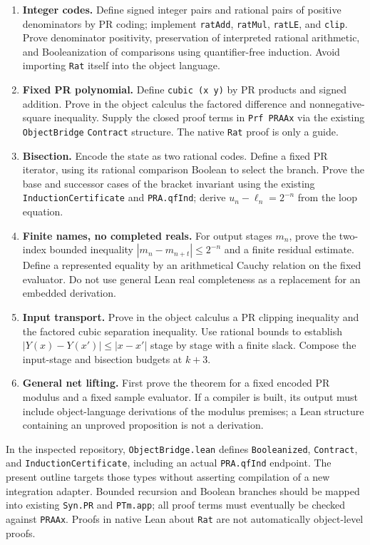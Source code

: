 \documentclass[11pt]{article}
\begin{document}
\begin{enumerate}[label=\arabic*.]
\item \textbf{Integer codes.} Define signed integer pairs and rational pairs of positive denominators by PR coding; implement \texttt{ratAdd}, \texttt{ratMul}, \texttt{ratLE}, and \texttt{clip}. Prove denominator positivity, preservation of interpreted rational arithmetic, and Booleanization of comparisons using quantifier-free induction. Avoid importing \texttt{Rat} itself into the object language.
\item \textbf{Fixed PR polynomial.} Define \texttt{cubic (x y)} by PR products and signed addition. Prove in the object calculus the factored difference and nonnegative-square inequality. Supply the closed proof terms in \texttt{Prf PRAAx} via the existing \texttt{ObjectBridge} \texttt{Contract} structure. The native \texttt{Rat} proof is only a guide.
\item \textbf{Bisection.} Encode the state as two rational codes. Define a fixed PR iterator, using its rational comparison Boolean to select the branch. Prove the base and successor cases of the bracket invariant using the existing \texttt{InductionCertificate} and \texttt{PRA.qfInd}; derive $u_n-\ell_n=2^{-n}$ from the loop equation.
\item \textbf{Finite names, no completed reals.} For output stages $m_n$, prove the two-index bounded inequality $|m_n-m_{n+t}|\le2^{-n}$ and a finite residual estimate. Define a represented equality by an arithmetical Cauchy relation on the fixed evaluator. Do not use general Lean real completeness as a replacement for an embedded derivation.
\item \textbf{Input transport.} Prove in the object calculus a PR clipping inequality and the factored cubic separation inequality. Use rational bounds to establish $|Y(x)-Y(x')|\le|x-x'|$ stage by stage with a finite slack. Compose the input-stage and bisection budgets at $k+3$.
\item \textbf{General net lifting.} First prove the theorem for a fixed encoded PR modulus and a fixed sample evaluator. If a compiler is built, its output must include object-language derivations of the modulus premises; a Lean structure containing an unproved proposition is not a derivation.
\end{enumerate}

In the inspected repository, \texttt{ObjectBridge.lean} defines \texttt{Booleanized}, \texttt{Contract}, and \texttt{InductionCertificate}, including an actual \texttt{PRA.qfInd} endpoint. The present outline targets those types without asserting compilation of a new integration adapter. Bounded recursion and Boolean branches should be mapped into existing \texttt{Syn.PR} and \texttt{PTm.app}; all proof terms must eventually be checked against \texttt{PRAAx}. Proofs in native Lean about \texttt{Rat} are not automatically object-level proofs.
\end{document}
